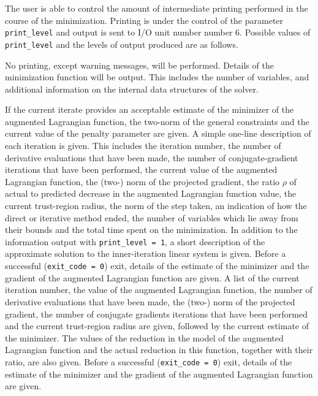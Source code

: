 \documentclass{galahad}
\begin{document}
The user is able to control the amount of intermediate printing
performed in the course of the minimization. Printing is under
the control of the parameter {\tt print\_level} and output is sent to
I/O unit number number 6. Possible values of {\tt print\_level} and the levels
of output produced are as follows.
\begin{description}
 No printing, except warning messages, will be
   performed.
 Details of the minimization function will be
   output. This includes the number of variables, and additional
   information on the internal data structures of the solver.

                 If the current iterate provides an acceptable
                 estimate of the minimizer of the augmented Lagrangian
                 function, the two-norm of the general constraints and
                 the current value of the penalty parameter are given.
 A simple one-line description of each iteration is
                 given. This includes the iteration number, the
                 number of derivative evaluations that have been
                 made, the number of conjugate-gradient iterations
                 that have been performed,
                 the current value of the augmented Lagrangian
                 function, the (two-) norm
                 of the projected gradient,
                 the ratio $\rho$ of actual to predicted decrease
                 in the augmented Lagrangian function value,
                 the current trust-region radius,
                 the norm of the step taken,
                 an indication of how the direct or iterative
                 method ended, the number of variables which lie
                 away from their bounds and the total time
                 spent on the minimization.
 In addition to the information output with 
                 {\tt print\_level = 1},
                 a short description of the approximate solution
                 to the inner-iteration linear system is given.
                 Before a successful ({\tt exit\_code = 0}) exit, details of
                 the estimate of the minimizer and the
                 gradient of the augmented Lagrangian
                 function are given.
 A list of the current iteration number, the value
				 of the augmented Lagrangian function, the
                 number of derivative evaluations that have been
                 made, the (two-) norm
                 of the projected gradient,
                 the number of conjugate gradients
                 iterations that have been performed and the
                 current trust-region radius
                 are given, followed by the
                 current estimate of the minimizer.
                 The values of the reduction in the model of the
                 augmented Lagrangian function
                 and the actual reduction in this
                 function, together with their ratio, are also given.
                 Before a successful ({\tt exit\_code = 0}) exit, details of
                 the estimate of the minimizer and the
                 gradient of the augmented Lagrangian function are given.


\end{description}
\end{document}

